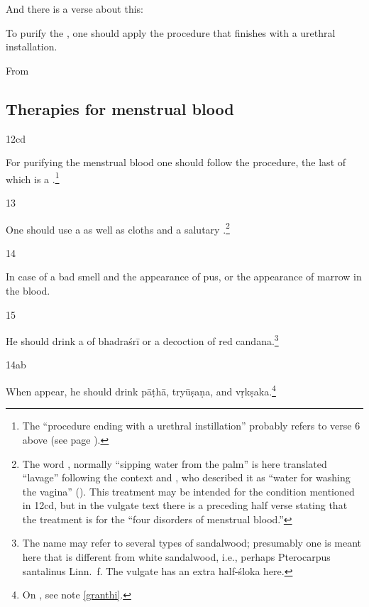 \begin{translation}
And there is a verse about this:
\begin{sloka}
To purify the , one should apply the procedure 
that finishes with a urethral installation.    
    
\end{sloka}

From

\subsection{Therapies for menstrual blood}

\item [12cd]

For purifying the menstrual blood one should follow the procedure, the
last of which is a .\footnote{The
    “procedure ending with a urethral instillation” probably refers to verse
    6 above (see page \pageref{uttarabastyantam}).}
    
    
 \item[13]  
 
 One should use a  as well as cloths and a salutary
.\footnote{The word , normally
    “sipping water from the palm” is here translated “lavage” following the
    context and , who described it as “water for
    washing the vagina” ().  This treatment may be
    intended for the condition mentioned in 12cd, but in the vulgate text
    there is a preceding half verse stating that the treatment is for the
    “four disorders of menstrual blood.”}
    
\item[14]

In case of a bad smell and the appearance of pus, or the appearance of
marrow in the blood.
\item [15]

He should drink a  of \gls{bhadraśrī} or a decoction of 
red \gls{candana}.\footnote{The name  may refer to several 
types of sandalwood; presumably one is meant here that is different from 
white sandalwood, i.e., perhaps Pterocarpus santalinus Linn.\ f.  The vulgate 
has an extra half-śloka here.}
 
\item[14ab]
 
 When  appear, he should drink \gls{pāṭhā}, 
 \gls{tryūṣaṇa}, and \gls{vṛkṣaka}.\footnote{On , see note 
 \ref{granthi}.}
 

\end{translation}

